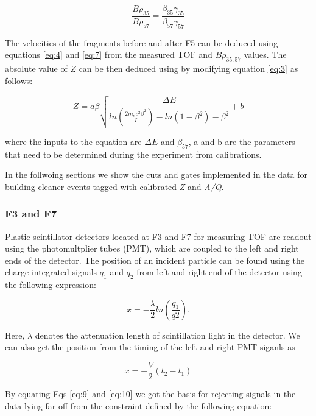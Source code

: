 \begin{equation}\label{eq:7}
\frac{B \rho_{35}}{B \rho_{57}} = \frac{\beta_{35} \gamma_{35}}{\beta_{57} \gamma_{57}}
\end{equation}


The velocities of the fragments before and after F5 can be deduced using equations \ref{eq:4} and \ref{eq:7} from the measured TOF and $B\rho_{35,57}$ values. The absolute value of $\textit{Z}$ can be then deduced using by modifying equation \ref{eq:3} as follows:

\begin{equation}\label{eq:8}
Z = a \beta \sqrt{\frac{\Delta E}{ln \left (\frac{2m_{e} c^2 \beta^2}{I} \right ) -ln(1-\beta^2) -\beta^{2}}} + b
\end{equation}

where the inputs to the equation are $\Delta E$ and $\beta_{57}$, a and b are the parameters that need to be determined during the experiment from calibrations.

In the follwoing sections we show the cuts and gates implemented in the data for building cleaner events tagged with calibrated \textit{Z} and \textit{A/Q}.


\subsubsection{F3 and F7}

Plastic scintillator detectors located at F3 and F7 for measuring TOF are readout using the photomultplier tubes (PMT), which are coupled to the left and right ends of the detector. The position of an incident particle can be found using the charge-integrated signals $q_{1}$ and $q_{2}$ from left and right end of the detector using the following expression:

\begin{equation}\label{eq:9}
x = -\dfrac{\lambda}{2} ln \left ( \dfrac{q_{1}}{q{2}} \right ).
\end{equation}


Here, $\lambda$ denotes the attenuation length of scintillation light in the detector. We can also get the position from the timing of the left and right PMT siganls as 

\begin{equation}\label{eq:10}
x = -\dfrac{V}{2}(t_{2}-t_{1})
\end{equation}

By equating Eqs \ref{eq:9} and \ref{eq:10} we got the basis for rejecting signals in the data lying far-off from the constraint defined by the following equation:

